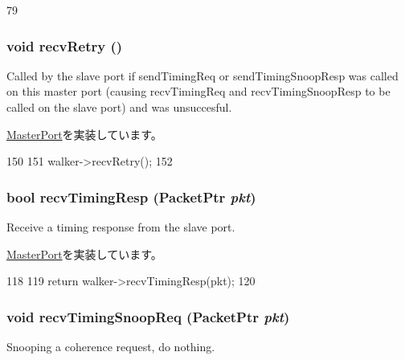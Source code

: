 \begin{DoxyCode}
79 { }
\end{DoxyCode}
\hypertarget{classX86ISA_1_1Walker_1_1WalkerPort_a29cb5a4f98063ce6e9210eacbdb35298}{
\subsubsection[{recvRetry}]{\setlength{\rightskip}{0pt plus 5cm}void recvRetry ()}}
\label{classX86ISA_1_1Walker_1_1WalkerPort_a29cb5a4f98063ce6e9210eacbdb35298}
Called by the slave port if sendTimingReq or sendTimingSnoopResp was called on this master port (causing recvTimingReq and recvTimingSnoopResp to be called on the slave port) and was unsuccesful. 

\hyperlink{classMasterPort_ac1ccc3bcf7ebabb20b57fab99b2be5b0}{MasterPort}を実装しています。


\begin{DoxyCode}
150 {
151     walker->recvRetry();
152 }
\end{DoxyCode}
\hypertarget{classX86ISA_1_1Walker_1_1WalkerPort_a482dba5588f4bee43e498875a61e5e0b}{
\subsubsection[{recvTimingResp}]{\setlength{\rightskip}{0pt plus 5cm}bool recvTimingResp ({\bf PacketPtr} {\em pkt})}}
\label{classX86ISA_1_1Walker_1_1WalkerPort_a482dba5588f4bee43e498875a61e5e0b}
Receive a timing response from the slave port. 

\hyperlink{classMasterPort_abd323548d6c93f8b0543f1fe3a86ca35}{MasterPort}を実装しています。


\begin{DoxyCode}
118 {
119     return walker->recvTimingResp(pkt);
120 }
\end{DoxyCode}
\hypertarget{classX86ISA_1_1Walker_1_1WalkerPort_aff3031c56fc4947a19695c868bb8233e}{
\subsubsection[{recvTimingSnoopReq}]{\setlength{\rightskip}{0pt plus 5cm}void recvTimingSnoopReq ({\bf PacketPtr} {\em pkt})}}
\label{classX86ISA_1_1Walker_1_1WalkerPort_aff3031c56fc4947a19695c868bb8233e}
Snooping a coherence request, do nothing. 

